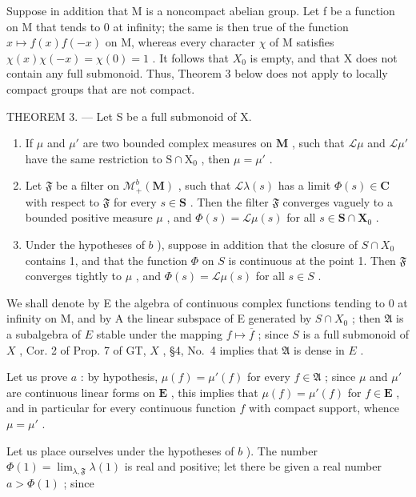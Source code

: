 Suppose in addition that M is a noncompact abelian group. Let f be a function on M that tends to 0 at infinity; the same is then true of the function \(x \mapsto f(x)f(-x)\) on M, whereas every character \(\chi\) of M satisfies \(\chi(x)\chi(-x) = \chi(0) = 1\) . It follows that \(X_{0}\) is empty, and that X does not contain any full submonoid. Thus, Theorem 3 below does not apply to locally compact groups that are not compact.

THEOREM 3. --- Let S be a full submonoid of X.

\begin{enumerate}
\def\labelenumi{\alph{enumi})}
\item
  If \(\mu\) and \(\mu'\) are two bounded complex measures on \(\mathbf{M}\) , such that \(\mathcal{L}\mu\) and \(\mathcal{L}\mu'\) have the same restriction to \(\mathrm{S} \cap \mathrm{X}_0\) , then \(\mu = \mu'\) .
\item
  Let \(\mathfrak{F}\) be a filter on \(\mathcal{M}_{+}^{b}(\mathbf{M})\) , such that \(\mathcal{L}\lambda(s)\) has a limit \(\Phi(s) \in \mathbf{C}\) with respect to \(\mathfrak{F}\) for every \(s \in \mathbf{S}\) . Then the filter \(\mathfrak{F}\) converges vaguely to a bounded positive measure \(\mu\) , and \(\Phi(s) = \mathcal{L}\mu(s)\) for all \(s \in \mathbf{S} \cap \mathbf{X}_0\) .
\item
  Under the hypotheses of \(b\) ), suppose in addition that the closure of \(S \cap X_0\) contains 1, and that the function \(\Phi\) on \(S\) is continuous at the point 1. Then \(\mathfrak{F}\) converges tightly to \(\mu\) , and \(\Phi(s) = \mathcal{L}\mu(s)\) for all \(s \in S\) .
\end{enumerate}

We shall denote by E the algebra of continuous complex functions tending to 0 at infinity on M, and by A the linear subspace of E generated by \(S \cap X_0\) ; then \(\mathfrak{A}\) is a subalgebra of \(E\) stable under the mapping \(f \mapsto \overline{f}\) ; since \(S\) is a full submonoid of \(X\) , Cor. 2 of Prop. 7 of GT, \(X\) , §4, No.~4 implies that \(\mathfrak{A}\) is dense in \(E\) .

Let us prove \(a\) : by hypothesis, \(\mu(f) = \mu'(f)\) for every \(f \in \mathfrak{A}\) ; since \(\mu\) and \(\mu'\) are continuous linear forms on \(\mathbf{E}\) , this implies that \(\mu(f) = \mu'(f)\) for \(f \in \mathbf{E}\) , and in particular for every continuous function \(f\) with compact support, whence \(\mu = \mu'\) .

Let us place ourselves under the hypotheses of \(b\) ). The number \(\Phi(1) = \lim_{\lambda, \mathfrak{F}} \lambda(1)\) is real and positive; let there be given a real number \(a > \Phi(1)\) ; since

